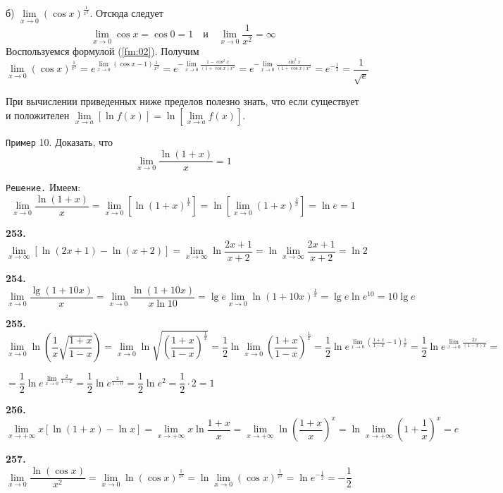 \documentclass[12pt]{article}
\begin{document}
	\medskip
	б) $\lim\limits_{x\to0}(\cos x)^{\frac{1}{x^2}}$. Отсюда следует
	\[
		\lim\limits_{x\to0}\cos x = \cos 0 = 1\quad\text{и}\quad\lim\limits_{x\to0}\frac{1}{x^2} = \infty
	\]
	Воспользуемся формулой (\ref{fm:02}). Получим
	\[
		\lim\limits_{x\to0}(\cos x)^{\frac{1}{x^2}} = e^{\lim\limits_{x\to0}(\cos x-1)\frac{1}{x^2}} = e^{-\lim\limits_{x\to0}\frac{1-\cos^2 x}{(1+\cos x)x^2}} = e^{-\lim\limits_{x\to0}\frac{\sin^2 x}{(1+\cos x)x^2}} = e^{-\frac{1}{2}} = \dfrac{1}{\sqrt{e}}
	\]
	
	При вычислении приведенных ниже пределов полезно знать, что если существует и положителен $\lim\limits_{x\to a}[\ln f(x)]=\ln [\lim\limits_{x\to a}f(x)]$.
	
	{\tt Пример} 10. Доказать, что
	\[
		\lim\limits_{x\to0}\dfrac{\ln(1+x)}{x} = 1\tag{4}\label{fm:ln}
	\]
	
	{\tt Решение.} Имеем:
	\[
		\lim\limits_{x\to0}\dfrac{\ln(1+x)}{x} = \lim\limits_{x\to0}[\ln(1+x)^{\frac{1}{x}}] = \ln[\lim\limits_{x\to0}(1+x)^{\frac{1}{x}}] = \ln e =1
	\]
	
	\medskip
	{\bf 253.} $\lim\limits_{x\to\infty}[\ln(2x+1)-\ln(x+2)] = \lim\limits_{x\to\infty} \ln \dfrac{2x+1}{x+2} = \ln \lim\limits_{x\to\infty}\dfrac{2x+1}{x+2} = \ln 2 $
	
	\medskip
	{\bf 254.} $\lim\limits_{x\to0}\dfrac{\lg(1+10x)}{x} = \lim\limits_{x\to0} \dfrac{\ln(1+10x)}{x\ln10} = \lg e \lim\limits_{x\to0} \ln (1+10x)^{\frac{1}{x}} = \lg e \ln e^{10} = 10\lg e$
	
	{\bf 255.} $\lim\limits_{x\to0}\ln\left( \dfrac{1}{x}\sqrt{\dfrac{1+x}{1-x}}\right)  = \lim\limits_{x\to0}\ln \sqrt{\left(\dfrac{1+x}{1-x}\right)^{\frac{1}{x}}} = \dfrac{1}{2} \ln\lim\limits_{x\to0} \left(\dfrac{1+x}{1-x}\right)^{\frac{1}{x}} = \dfrac{1}{2} \ln e^{\lim\limits_{x\to0}\left(\frac{1+x}{1-x}-1\right)\frac{1}{x}} = \dfrac{1}{2}\ln e^{\lim\limits_{x\to0}\frac{2x}{(1-x)x}} = 
	$
	
	$
	= \dfrac{1}{2}\ln e^{\lim\limits_{x\to0}\frac{2}{1-x}} =  \dfrac{1}{2}\ln e^{\frac{2}{1-0}} = \dfrac{1}{2}\ln e^2 = \dfrac{1}{2}\cdot2 = 1$   
	
	\medskip
	{\bf 256.} $\lim\limits_{x\to+\infty} x[\ln(1+x)-\ln x] = \lim\limits_{x\to+\infty} x\ln \dfrac{1+x}{x} = \lim\limits_{x\to+\infty}\ln\left(\dfrac{1+x}{x}\right)^x = \ln \lim\limits_{x\to+\infty}\left(1+\dfrac{1}{x}\right)^x = e$
	
	\medskip
	{\bf 257.} $\lim\limits_{x\to0}\dfrac{\ln(\cos x)}{x^2} = \lim\limits_{x\to0} \ln (\cos x)^{\frac{1}{x^2}} = \ln \lim\limits_{x\to0} (\cos x)^{\frac{1}{x^2}} = \ln e^{-\frac{1}{2}} = -\dfrac{1}{2}$ 
	
\end{document}
